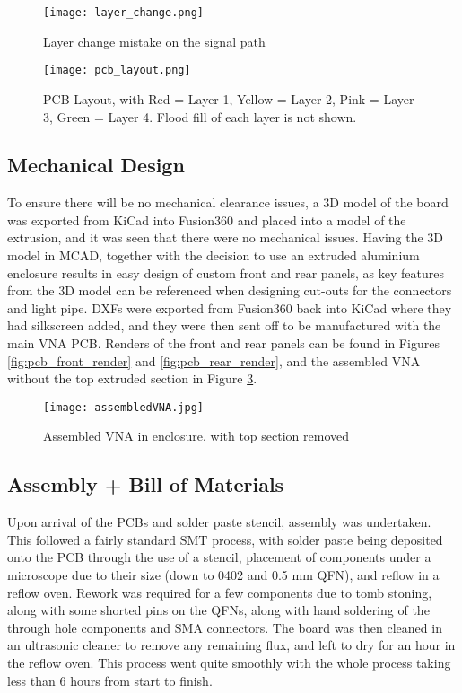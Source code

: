 \begin{figure}[H]
	\centering
	\texttt{[image: layer\_change.png]}
	\caption{Layer change mistake on the signal path}
	\label{fig:pcb_layer_change}
\end{figure}

\begin{landscape}
	\begin{figure}
		\centering
		\texttt{[image: pcb\_layout.png]}
		\caption{PCB Layout, with Red = Layer 1, Yellow = Layer 2, Pink = Layer 3, Green = Layer 4. Flood fill of each layer is not shown.}
		\label{fig:pcb_layout}
	\end{figure}
\end{landscape}

\subsection{Mechanical Design}
To ensure there will be no mechanical clearance issues, a 3D model of the board was exported from KiCad into Fusion360 and placed into a model of the extrusion, and it was seen that there were no mechanical issues. Having the 3D model in MCAD, together with the decision to use an extruded aluminium enclosure results in easy design of custom front and rear panels, as key features from the 3D model can be referenced when designing cut-outs for the connectors and light pipe. DXFs were exported from Fusion360 back into KiCad where they had silkscreen added, and they were then sent off to be manufactured with the main VNA PCB. Renders of the front and rear panels can be found in Figures \ref{fig:pcb_front_render} and \ref{fig:pcb_rear_render}, and the assembled VNA without the top extruded section in Figure \ref{fig:pcb_assembled}.

\begin{figure}[H]
	\centering
	\texttt{[image: assembledVNA.jpg]}
	\caption{Assembled VNA in enclosure, with top section removed}
	\label{fig:pcb_assembled}
\end{figure}

\subsection{Assembly + Bill of Materials}
Upon arrival of the PCBs and solder paste stencil, assembly was undertaken. This followed a fairly standard SMT process, with solder paste being deposited onto the PCB through the use of a stencil, placement of components under a microscope due to their size (down to 0402 and 0.5 mm QFN), and reflow in a reflow oven. Rework was required for a few components due to tomb stoning, along with some shorted pins on the QFNs, along with hand soldering of the through hole components and SMA connectors. The board was then cleaned in an ultrasonic cleaner to remove any remaining flux, and left to dry for an hour in the reflow oven. This process went quite smoothly with the whole process taking less than 6 hours from start to finish. 


